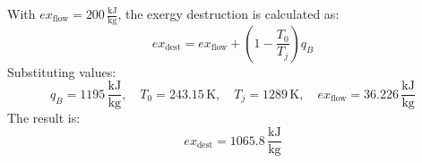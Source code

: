 With \( ex_{\text{flow}} = 200 \, \frac{\text{kJ}}{\text{kg}} \), the exergy destruction is calculated as:  
\[
ex_{\text{dest}} = ex_{\text{flow}} + \left(1 - \frac{T_0}{T_j}\right) q_B
\]  
Substituting values:  
\[
q_B = 1195 \, \frac{\text{kJ}}{\text{kg}}, \quad T_0 = 243.15 \, \text{K}, \quad T_j = 1289 \, \text{K}, \quad ex_{\text{flow}} = 36.226 \, \frac{\text{kJ}}{\text{kg}}
\]  
The result is:  
\[
ex_{\text{dest}} = 1065.8 \, \frac{\text{kJ}}{\text{kg}}
\]